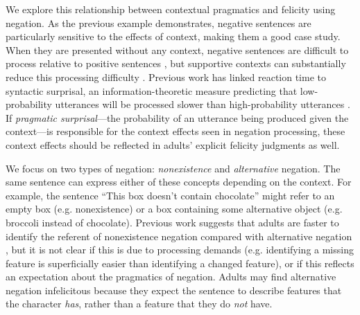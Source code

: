 \documentclass[10pt,letterpaper]{article}
\begin{document}
We explore this relationship between contextual pragmatics and felicity using negation. As the previous example demonstrates, negative sentences are particularly sensitive to the effects of context, making them a good case study.  When they are presented without any context, negative sentences are difficult to process relative to positive sentences \cite{hclark1972, carpenter1975, just1971, just1976}, but supportive contexts can substantially reduce this processing difficulty \cite{wason1965, glenberg1999, ludtke2006, nieuwland2008, dale2011, nordmeyer2014}.   Previous work has linked reaction time to syntactic surprisal, an information-theoretic measure predicting that low-probability utterances will be processed slower than high-probability utterances \cite{levy2008}.  If \emph{pragmatic surprisal}---the probability of an utterance being produced given the context---is responsible for the context effects seen in negation processing, these context effects should be reflected in adults' explicit felicity judgments as well.   %

We focus on two types of negation: \emph{nonexistence} and \emph{alternative} negation.  The same sentence can express either of these concepts depending on the context.  For example, the sentence ``This box doesn't contain chocolate'' might refer to an empty box (e.g. nonexistence) or a box containing some alternative object (e.g. broccoli instead of chocolate).  Previous work suggests that adults are faster to identify the referent of nonexistence negation compared with alternative negation \cite{nordmeyer2013, nordmeyer2014b}, but it is not clear if this is due to processing demands (e.g. identifying a missing feature is superficially easier than identifying a changed feature), or if this reflects an expectation about the pragmatics of negation.  Adults may find alternative negation infelicitous  because they expect the sentence to describe features that the character \emph{has}, rather than a feature that they do \emph{not} have.


\end{document}

